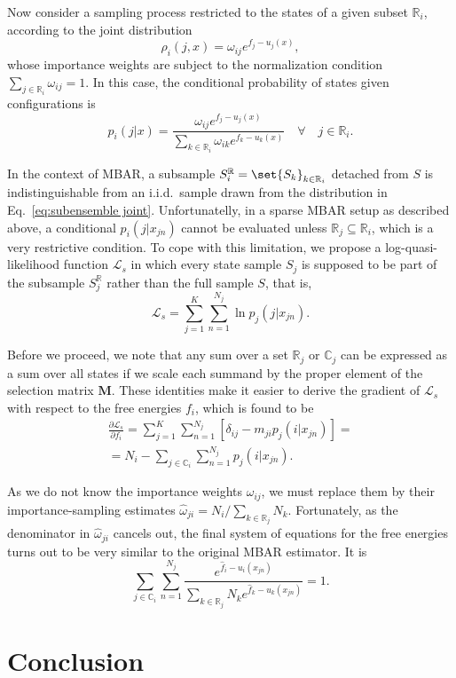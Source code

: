 \documentclass[layout=twocolumn]{achemso}
\DeclarePairedDelimiter\set\{\}
\newcommand{\mt}[1]{\boldsymbol{\mathbf{#1}}}   %
\newcommand{\diff}[2]{\frac{\partial{#1}}{\partial{#2}}} %
\begin{document}
Now consider a sampling process restricted to the states of a given subset $\mathbb{R}_i$, according to the joint distribution
\begin{equation}
    \label{eq:subensemble joint}
    \rho_i(j, x) = \omega_{ij} e^{f_j - u_j(x)},
\end{equation}
whose importance weights are subject to the normalization condition $\sum_{j \in \mathbb{R}_i} \omega_{ij} = 1$.
In this case, the conditional probability of states given configurations is
\begin{equation}
    \label{eq:subensemble conditional}
    p_i(j|x) = \frac{
        \omega_{ij} e^{f_j - u_j(x)}
    }{
        \sum_{k \in \mathbb{R}_i} \omega_{ik} e^{f_k - u_k(x)}
    }
    \quad \forall \quad j \in \mathbb{R}_i.
\end{equation}

In the context of MBAR, a subsample $S^\mathbb{R}_i = \set{S_k}_{k \in \mathbb{R}_i}$ detached from $S$ is indistinguishable from an i.i.d.~sample drawn from the distribution in Eq.~\eqref{eq:subensemble joint}.
Unfortunatelly, in a sparse MBAR setup as described above, a conditional $p_i(j|x_{jn})$ cannot be evaluated unless $\mathbb{R}_j \subseteq \mathbb{R}_i$, which is a very restrictive condition.
To cope with this limitation, we propose a log-quasi-likelihood function $\mathcal{L}_s$ in which every state sample $S_j$ is supposed to be part of the subsample $S^\mathbb{R}_j$ rather than the full sample $S$, that is,
\begin{equation}
    \label{eq:sparse log-quasi-likelihood}
    \mathcal{L}_s = \sum_{j=1}^K \sum_{n=1}^{N_j} \ln p_j(j|x_{jn}).
\end{equation}

Before we proceed, we note that any sum over a set $\mathbb{R}_j$ or $\mathbb{C}_j$ can be expressed as a sum over all states if we scale each summand by the proper element of the selection matrix $\mt M$.
These identities make it easier to derive the gradient of $\mathcal{L}_s$ with respect to the free energies $f_i$, which is found to be
\begin{multline}
    \label{eq:sparse gradient}
    \diff{\mathcal{L}_s}{f_i} = \sum_{j=1}^K \sum_{n=1}^{N_j} \left[
        \delta_{ij} - m_{ji} p_j(i|x_{jn}) \right] = \\
    = N_i - \sum_{j \in \mathbb{C}_i} \sum_{n=1}^{N_j} p_j(i|x_{jn}).
\end{multline}

As we do not know the importance weights $\omega_{ij}$, we must replace them by their importance-sampling estimates $\hat{\omega}_{ji} = N_i/\sum_{k \in \mathbb{R}_j} N_k$.
Fortunately, as the denominator in $\hat{\omega}_{ji}$ cancels out, the final system of equations for the free energies turns out to be very similar to the original MBAR estimator.
It is
\begin{equation}
    \sum_{j \in \mathbb{C}_i} \sum_{n=1}^{N_j} \frac{
        e^{\hat{f}_i - u_i(x_{jn})}
    }{
        \sum_{k \in \mathbb{R}_j} N_k e^{\hat{f}_k - u_k(x_{jn})}
    } = 1.
\end{equation}

\section{Conclusion}



\end{document}
